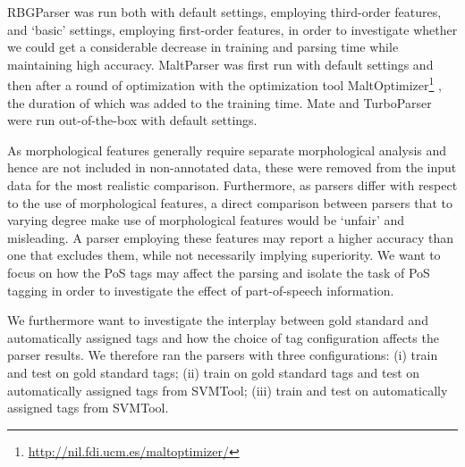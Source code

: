 \documentclass[a4paper,12pt,english]{book}
\begin{document}
RBGParser was run both with default settings, employing third-order features,
and `basic' settings, employing first-order features, in order to investigate
whether we could get a considerable decrease in training and parsing time while
maintaining high accuracy. MaltParser was first run with default settings and
then after a round of optimization with the optimization tool
MaltOptimizer\footnote{\url{http://nil.fdi.ucm.es/maltoptimizer/}}
\cite{Bal:Niv:12}, the duration of which was added to the training time. Mate
and TurboParser were run out-of-the-box with default settings.

As morphological features generally require separate morphological analysis and
hence are not included in non-annotated data, these were removed from the input
data for the most realistic comparison. Furthermore, as parsers differ with
respect to the use of morphological features, a direct comparison between
parsers that to varying degree make use of morphological features would be
`unfair' and misleading. A parser employing these features may report a higher
accuracy than one that excludes them, while not necessarily implying
superiority. We want to focus on how the PoS tags may affect the parsing and
isolate the task of PoS tagging in order to investigate the effect of
part-of-speech information.

We furthermore want to investigate the interplay between gold standard and
automatically assigned tags and how the choice of tag configuration affects the
parser results. We therefore ran the parsers with three configurations: (i)
train and test on gold standard tags; (ii) train on gold standard tags and test
on automatically assigned tags from SVMTool; (iii) train and test on
automatically assigned tags from SVMTool.

\end{document}

